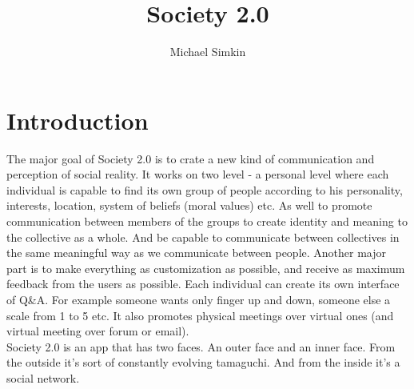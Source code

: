 \documentclass{article}
\title{\Huge Society 2.0}
\author{Michael Simkin}
\begin{document}
	\maketitle
	\section{Introduction}
	
	The major goal of Society 2.0 is to crate a new kind of communication and perception of social reality. It works on two level - a personal level where each individual is capable to find its own group of people according to his personality, interests, location, system of beliefs (moral values) etc. As well to promote communication between members of the groups to create identity and meaning to the collective as a whole. And be capable to communicate between collectives in the same meaningful way as we communicate between people. Another major part is to make everything as customization as possible, and receive as maximum feedback from the users as possible. Each individual can create its own interface of Q\&A. For example someone wants only finger up and down, someone else a scale from 1 to 5 etc. It also promotes physical meetings over virtual ones (and virtual meeting over forum or email).\\
	
	Society 2.0 is an app that has two faces. An outer face and an inner face. From the outside it's sort of constantly evolving tamaguchi. And from the inside it's a social network. \\
	
\end{document}
